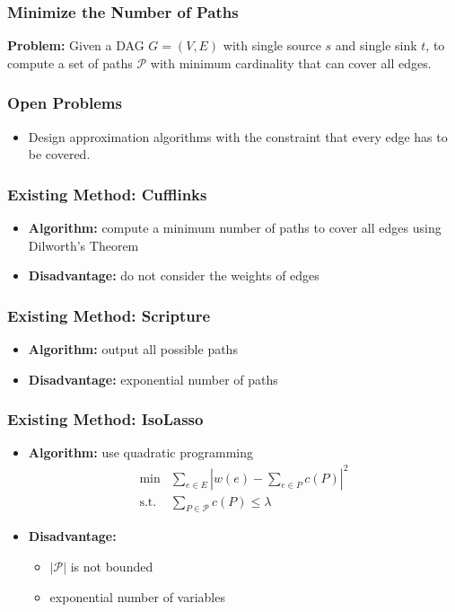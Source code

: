 \frame
{
	\frametitle{Minimize the Number of Paths}
	{\bf Problem:} Given a DAG $G=(V,E)$ with single source $s$ and single sink $t$, 
		to compute a set of paths $\mathcal{P}$ with minimum cardinality
		that can cover all edges.

	\vspace{0.4cm}

	

	\vspace{0.6cm}

	\vspace{-0.2cm}
	

	\vspace{2.0cm}
}

\frame
{
	\frametitle{Open Problems}
	\begin{itemize}
	\item Design approximation algorithms with the constraint that every edge has to be covered.
	\end{itemize}
}

\frame
{
	\frametitle{Existing Method: Cufflinks}

	\begin{itemize}
	\item {\bf Algorithm:} compute a minimum number of paths to cover all edges using Dilworth's Theorem
	\vspace{0.5cm}
	\item {\bf Disadvantage:} do not consider the weights of edges
	\end{itemize}
}

\frame
{
	\frametitle{Existing Method: Scripture}
	\begin{itemize}
	\item {\bf Algorithm:} output all possible paths
	\vspace{0.5cm}
	\item {\bf Disadvantage:} exponential number of paths
	\end{itemize}
}


\frame
{
	\frametitle{Existing Method: IsoLasso}
	\begin{itemize}
	\item {\bf Algorithm:} use quadratic programming
		\begin{displaymath}
		\begin{array}{rl}
		\min & \sum_{e\in E} | w(e) - \sum_{e\in P} c(P)|^2 \\
		\textrm{s.t.} & \sum_{P\in\mathcal{P}} c(P) \le \lambda
		\end{array}
		\end{displaymath}

	\vspace{0.2cm}
	\item {\bf Disadvantage:} 
		\begin{itemize}
		\item $|\mathcal{P}|$ is not bounded
		\item exponential number of variables
		\end{itemize}

	\end{itemize}
}


